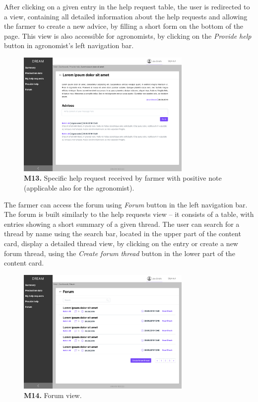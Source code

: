 After clicking on a given entry in the help request table, the user is redirected to a view, containing all detailed information about the help requests and allowing the farmer to create a new advice, by filling a short form on the bottom of the page. This view is also accessible for agronomists, by clicking on the \textit{Provide help} button in agronomist's left navigation bar.
\begin{figure}[H]
    \centering
    \includegraphics[width=0.75\textwidth]{mockups/Farmer_Dashboard_Provide help_Request.png}
    \caption{\textbf{M13.} Specific help request received by farmer with positive note (applicable also for the agronomist).}
\end{figure}

The farmer can access the forum using \textit{Forum} button in the left navigation bar. The forum is built similarly to the help requests view – it consists of a table, with entries showing a short summary of a given thread. The user can search for a thread by name using the search bar, located in the upper part of the content card, display a detailed thread view, by clicking on the entry or create a new forum thread, using the \textit{Create forum thread} button in the lower part of the content card.
\begin{figure}[H]
    \centering
    \includegraphics[width=0.75\textwidth]{mockups/Farmer_Dashboard_Forum.png}
    \caption{\textbf{M14.} Forum view.}
\end{figure}

